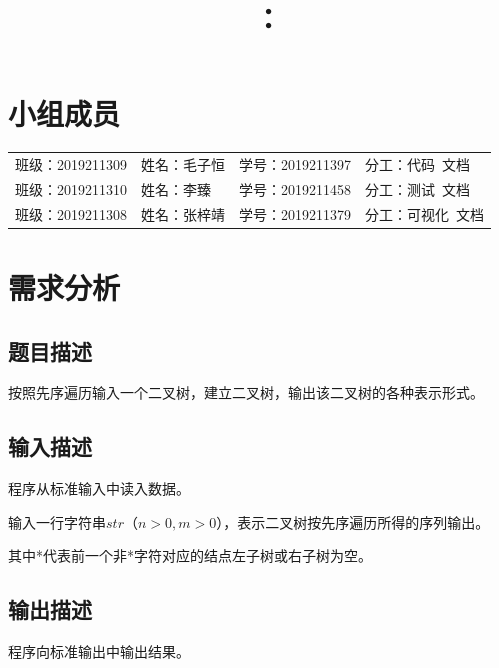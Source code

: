 \documentclass{article}
\title{\hmwkClass\ ：\hmwkTitle}
\author{\hmwkAuthorName}
\begin{document}
\maketitle

\section*{小组成员}

\setlength{\tabcolsep}{9mm}
{
    \begin{table}[htbp]
        \centering
        \begin{tabular}{llll}
            班级：2019211309 & 姓名：毛子恒 & 学号：2019211397 & 分工：代码\ 文档   \\

            班级：2019211310 & 姓名：李臻   & 学号：2019211458 & 分工：测试\ 文档   \\

            班级：2019211308 & 姓名：张梓靖 & 学号：2019211379 & 分工：可视化\ 文档 \\
        \end{tabular}
    \end{table}
}

\tableofcontents
\newpage

\section{需求分析}

\subsection{题目描述}

按照先序遍历输入一个二叉树，建立二叉树，输出该二叉树的各种表示形式。

\subsection{输入描述}

程序从标准输入中读入数据。

输入一行字符串$str$（$n>0,m>0$），表示二叉树按先序遍历所得的序列输出。

其中*代表前一个非*字符对应的结点左子树或右子树为空。

\subsection{输出描述}

程序向标准输出中输出结果。
\end{document}
